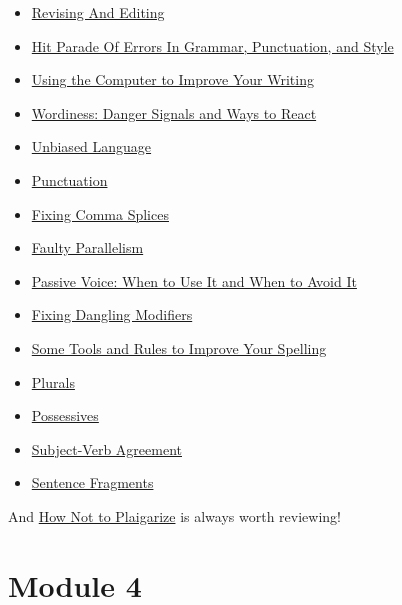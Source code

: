 \documentclass[
  openany]{book}
\begin{document}
\begin{itemize}
\item
  \href{https://advice.writing.utoronto.ca/revising/revising-and-editing/}{Revising And Editing}
\item
  \href{https://advice.writing.utoronto.ca/revising/hit-parade-of-errors/}{Hit Parade Of Errors In Grammar, Punctuation, and Style}
\item
  \href{https://advice.writing.utoronto.ca/revising/using-the-computer/}{Using the Computer to Improve Your Writing}
\item
  \href{https://advice.writing.utoronto.ca/revising/wordiness/}{Wordiness: Danger Signals and Ways to React}
\item
  \href{https://advice.writing.utoronto.ca/revising/unbiased-language/}{Unbiased Language}
\item
  \href{https://advice.writing.utoronto.ca/revising/punctuation/}{Punctuation}
\item
  \href{https://advice.writing.utoronto.ca/revising/comma-splices/}{Fixing Comma Splices}
\item
  \href{https://advice.writing.utoronto.ca/revising/faulty-parallelism/}{Faulty Parallelism}
\item
  \href{https://advice.writing.utoronto.ca/revising/passive-voice/}{Passive Voice: When to Use It and When to Avoid It}
\item
  \href{https://advice.writing.utoronto.ca/revising/dangling-modifiers/}{Fixing Dangling Modifiers}
\item
  \href{https://advice.writing.utoronto.ca/revising/spelling/}{Some Tools and Rules to Improve Your Spelling}
\item
  \href{https://advice.writing.utoronto.ca/revising/plurals/}{Plurals}
\item
  \href{https://advice.writing.utoronto.ca/revising/possessives/}{Possessives}
\item
  \href{https://advice.writing.utoronto.ca/revising/subject-verb-agreement/}{Subject-Verb Agreement}
\item
  \href{https://advice.writing.utoronto.ca/revising/sentence-fragments/}{Sentence Fragments}
\end{itemize}

And \href{https://advice.writing.utoronto.ca/using-sources/how-not-to-plagiarize/}{How Not to Plaigarize} is always worth reviewing!

\hypertarget{m4}{%
\chapter{Module 4}\label{m4}}
\end{document}
